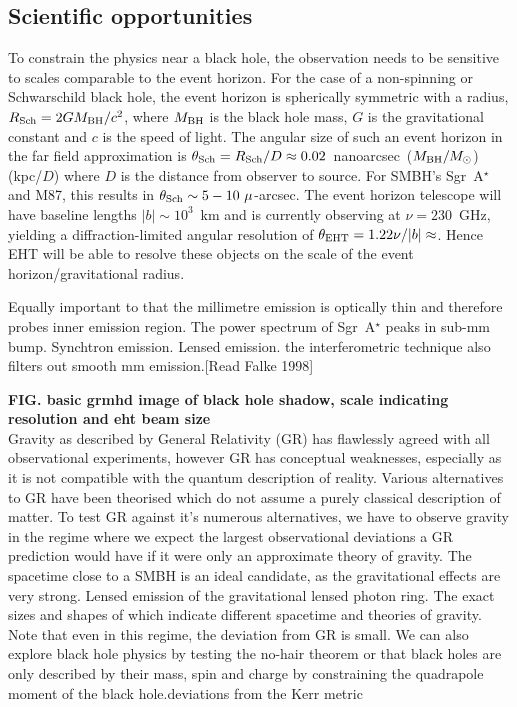 \subsection{Scientific opportunities}


To constrain the physics near a black hole, the observation needs to be sensitive to scales comparable to the event horizon. For the case of a non-spinning or Schwarschild black hole, the event horizon is spherically symmetric with a radius, $R_{\rm Sch} = 2 G M_{\rm BH} /c^2$,  where $M_{\rm BH}$ is the black hole mass, $G$ is the gravitational constant and $c$ is the speed of light. The angular size of such an event horizon in the far field approximation is $\theta_{\rm Sch} = R_{\rm Sch} / D \approx 0.02$~nanoarcsec~($M_{\rm BH}/M_\odot$)(kpc/$D$) where $D$ is the distance from observer to source. For SMBH's Sgr~A$^\star$ and M87, this results in $\theta_{\rm Sch} \sim 5-10\ \mu$-arcsec. The event horizon telescope will have baseline lengths $|b| \sim 10^3$~km and is currently observing at $\nu =230$~GHz, yielding a diffraction-limited angular resolution of $\theta_{\rm EHT} = 1.22 \nu/ |b| \approx $. Hence EHT will be able to resolve these objects on the scale of the event horizon/gravitational radius. 

Equally important to  that the millimetre emission is optically thin and therefore probes inner emission region. The power spectrum of Sgr~A$^\star$ peaks in sub-mm bump. Synchtron emission. Lensed emission. the interferometric technique also filters out smooth mm emission.[Read Falke 1998]

{\bf FIG. basic grmhd image of black hole shadow, scale indicating resolution and eht beam size}\\


Gravity as described by General Relativity (GR) has flawlessly agreed with all observational experiments, however GR has conceptual weaknesses, especially as it is not compatible with the quantum description of reality. Various alternatives to GR have been theorised which do not assume a purely classical description of matter. To test GR against it's numerous alternatives, we have to observe gravity in the regime where we expect the largest observational deviations a GR prediction would have if it were only an approximate theory of gravity.  The spacetime close to a SMBH is an ideal candidate, as the gravitational effects are very strong. Lensed emission of the gravitational lensed photon ring.  The exact sizes and shapes of which indicate different spacetime and theories of gravity. Note that even in this regime, the deviation from GR is small. We can also explore black hole physics by testing the no-hair theorem or that black holes are only described by their mass, spin and charge by constraining the quadrapole moment of the black hole.deviations
from the Kerr metric

